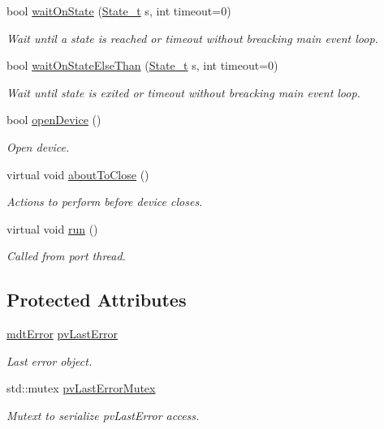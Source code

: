 \begin{DoxyCompactItemize}
bool \hyperlink{classmdt_usb_port_thread_new_a36e64cfa92754a8cc8e46f604efdb56c}{wait\-On\-State} (\hyperlink{classmdt_usb_port_thread_new_acff06a201f3949a442ee854e45176de9}{State\-\_\-t} s, int timeout=0)
\begin{DoxyCompactList}\small\item\em Wait until a state is reached or timeout without breacking main event loop. \end{DoxyCompactList}\item 
bool \hyperlink{classmdt_usb_port_thread_new_aa5c05a10493c2cb4e16db704bca7b048}{wait\-On\-State\-Else\-Than} (\hyperlink{classmdt_usb_port_thread_new_acff06a201f3949a442ee854e45176de9}{State\-\_\-t} s, int timeout=0)
\begin{DoxyCompactList}\small\item\em Wait until state is exited or timeout without breacking main event loop. \end{DoxyCompactList}\item 
bool \hyperlink{classmdt_usb_port_thread_new_a6486e21a70e3c065591d62269ecbc23c}{open\-Device} ()
\begin{DoxyCompactList}\small\item\em Open device. \end{DoxyCompactList}\item 
virtual void \hyperlink{classmdt_usb_port_thread_new_ae60c6844e195a2ba1ea0f4c2dc267d05}{about\-To\-Close} ()
\begin{DoxyCompactList}\small\item\em Actions to perform before device closes. \end{DoxyCompactList}\item 
virtual void \hyperlink{classmdt_usb_port_thread_new_af7b64a3ca3baac8a487484b9a9e6bac5}{run} ()
\begin{DoxyCompactList}\small\item\em Called from port thread. \end{DoxyCompactList}\end{DoxyCompactItemize}
\subsection*{Protected Attributes}
\begin{DoxyCompactItemize}
\item 
\hyperlink{classmdt_error}{mdt\-Error} \hyperlink{classmdt_usb_port_thread_new_a11cf4aaa691dfad9ae4af28cd1bda893}{pv\-Last\-Error}
\begin{DoxyCompactList}\small\item\em Last error object. \end{DoxyCompactList}\item 
std\-::mutex \hyperlink{classmdt_usb_port_thread_new_ab4cc1187ff45331bf873309b26bc9745}{pv\-Last\-Error\-Mutex}
\begin{DoxyCompactList}\small\item\em Mutext to serialize pv\-Last\-Error access. \end{DoxyCompactList}\end{DoxyCompactItemize}


